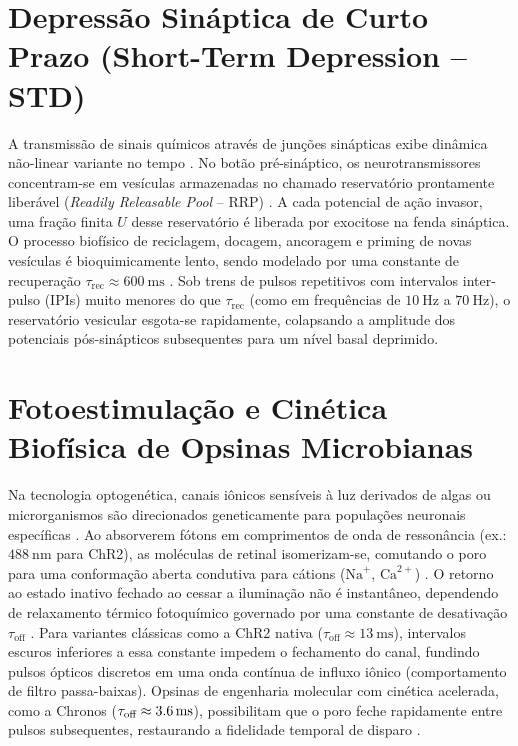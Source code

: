 \documentclass[12pt,openright,oneside,a4paper,brazil]{abntex2}
\begin{document}
\begin{apendicesenv}
    \section{Depressão Sináptica de Curto Prazo (Short-Term Depression -- STD)}
    A transmissão de sinais químicos através de junções sinápticas exibe dinâmica não-linear variante no tempo \cite{dayan2001, gerstner2014}. No botão pré-sináptico, os neurotransmissores concentram-se em vesículas armazenadas no chamado reservatório prontamente liberável (\emph{Readily Releasable Pool} -- RRP) \cite{kandel2021}. A cada potencial de ação invasor, uma fração finita $U$ desse reservatório é liberada por exocitose na fenda sináptica. O processo biofísico de reciclagem, docagem, ancoragem e priming de novas vesículas é bioquimicamente lento, sendo modelado por uma constante de recuperação $\tau_{\text{rec}} \approx \qty{600}{\milli\second}$ \cite{tsodyks1997, tsodyks1998}. Sob trens de pulsos repetitivos com intervalos inter-pulso (IPIs) muito menores do que $\tau_{\text{rec}}$ (como em frequências de $\qty{10}{\hertz}$ a $\qty{70}{\hertz}$), o reservatório vesicular esgota-se rapidamente, colapsando a amplitude dos potenciais pós-sinápticos subsequentes para um nível basal deprimido.

    \section{Fotoestimulação e Cinética Biofísica de Opsinas Microbianas}
    Na tecnologia optogenética, canais iônicos sensíveis à luz derivados de algas ou microrganismos são direcionados geneticamente para populações neuronais específicas \cite{boyden2005, deisseroth2011}. Ao absorverem fótons em comprimentos de onda de ressonância (ex.: $\qty{488}{\nano\meter}$ para ChR2), as moléculas de retinal isomerizam-se, comutando o poro para uma conformação aberta condutiva para cátions ($\text{Na}^+$, $\text{Ca}^{2+}$) \cite{nagel2003}. O retorno ao estado inativo fechado ao cessar a iluminação não é instantâneo, dependendo de relaxamento térmico fotoquímico governado por uma constante de desativação $\tau_{\text{off}}$ \cite{nikolic2009, grossman2011}. Para variantes clássicas como a ChR2 nativa ($\tau_{\text{off}} \approx \qty{13}{\milli\second}$), intervalos escuros inferiores a essa constante impedem o fechamento do canal, fundindo pulsos ópticos discretos em uma onda contínua de influxo iônico (comportamento de filtro passa-baixas). Opsinas de engenharia molecular com cinética acelerada, como a Chronos ($\tau_{\text{off}} \approx \qty{3{,}6}{\milli\second}$), possibilitam que o poro feche rapidamente entre pulsos subsequentes, restaurando a fidelidade temporal de disparo \cite{klapoetke2014}.

\end{apendicesenv}

\postextual


\end{document}
